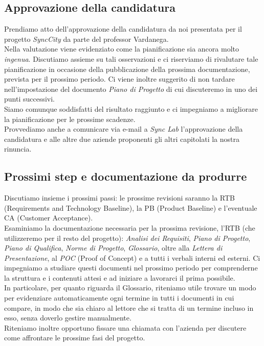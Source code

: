 \documentclass[italian,12pt]{article} %
\begin{document}
\subsection{Approvazione della candidatura}
Prendiamo atto dell'approvazione della candidatura da noi presentata per il progetto
\textit{SyncCity} da parte del professor Vardanega. \\
Nella valutazione viene evidenziato come la pianificazione sia ancora molto \textit{ingenua}.
Discutiamo assieme su tali osservazioni e ci riserviamo di rivalutare tale
pianificazione in occasione della pubblicazione della prossima documentazione,
prevista per il prossimo periodo. Ci viene inoltre suggerito di
non tardare nell'impostazione del documento \textit{Piano di Progetto} di cui
discuteremo in uno dei punti successivi. \\
Siamo comunque soddisfatti del risultato raggiunto e ci impegniamo a migliorare la
pianificazione per le prossime scadenze. \\
Provvediamo anche a comunicare via e-mail a \textit{Sync Lab} l'approvazione della
candidatura e alle altre due aziende proponenti gli altri capitolati la nostra
rinuncia.

\subsection{Prossimi step e documentazione da produrre}
Discutiamo insieme i prossimi passi: le prossime revisioni saranno la RTB
(Requirements and Technology Baseline), la PB (Product Baseline) e l'eventuale CA
(Customer Acceptance).\\
Esaminiamo la documentazione necessaria per la prossima revisione, l'RTB (che
utilizzeremo per il resto del progetto): \textit{Analisi dei Requisiti},
\textit{Piano di Progetto}, \textit{Piano di Qualifica}, \textit{Norme di Progetto},
\textit{Glossario},  oltre alla \textit{Lettera di Presentazione}, al \textit{POC}
(Proof of Concept) e a tutti i verbali interni ed esterni. Ci impegniamo a studiare
questi documenti nel prossimo periodo per comprenderne la struttura e i contenuti
attesi e ad iniziare a lavorarci il prima possibile. \\
In particolare, per quanto riguarda il Glossario, riteniamo utile trovare un modo
per evidenziare automaticamente ogni termine in tutti i documenti in cui compare,
in modo che sia chiaro al lettore che si tratta di un termine incluso in esso,
senza doverlo gestire manualmente. \\
Riteniamo inoltre opportuno fissare una chiamata con l'azienda per discutere
come affrontare le prossime fasi del progetto.
\end{document}
